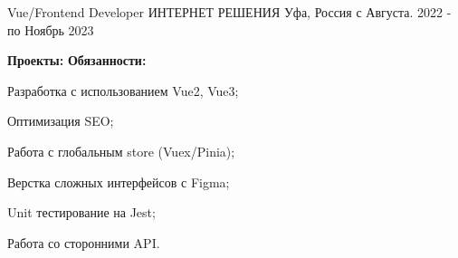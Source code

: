 \begin{cventries}
  \cventry
    {Vue/Frontend Developer} %
    {ИНТЕРНЕТ РЕШЕНИЯ} %
    {Уфа, Россия} %
    {с Августа. 2022 - по Ноябрь 2023} %
    {
      \begin{cvitems} %
        \newline \textbf{Проекты: }
        \newline \textbf{Обязанности:}
        \item {Разработка с использованием Vue2, Vue3;}
        \item {Оптимизация SEO;}
        \item {Работа с глобальным store (Vuex/Pinia);}
        \item {Верстка сложных интерфейсов с Figma;}
        \item {Unit тестирование на Jest;}
        \item {Работа со сторонними API.}
      \end{cvitems}
    }

\end{cventries}